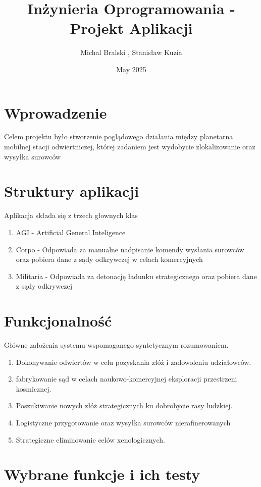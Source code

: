 \documentclass{article}
\title{Inżynieria Oprogramowania - Projekt Aplikacji}
\author{Michal Bralski , Stanisław Kuzia }
\date{May 2025}
\begin{document}
\maketitle

\section{Wprowadzenie}
Celem projektu było stworzenie poglądowego działania między planetarna mobilnej stacji odwiertniczej, której zadaniem jest wydobycie zlokalizowanie oraz wysyłka surowców 

\section{Struktury aplikacji}
Aplikacja składa się z trzech głownych klas
\begin{enumerate}
    \item AGI - Artificial General Inteligence
    \item Corpo - Odpowiada za manualne nadpisanie komendy wysłania surowców oraz pobiera dane z sądy odkrywczej w celach komercyjnych
    \item Militaria - Odpowiada za detonację ładunku strategicznego oraz pobiera dane z sądy odkrywczej
\end{enumerate}

\section{Funkcjonalność}
Główne założenia systemu wspomaganego syntetycznym rozumowaniem.
    \begin{enumerate}
        \item Dokonywanie odwiertów w celu pozyskania złóż i zadowoleniu udziałowców.
        \item fabrykowanie sąd w celach naukowo-komercyjnej eksploracji przestrzeni kosmicznej.
        \item Poszukiwanie nowych złóż strategicznych ku dobrobycie rasy ludzkiej.
        \item Logistyczne przygotowanie oraz wysyłka surowców nierafinerowanych
        \item Strategiczne eliminowanie celów xenologicznych.
    \end{enumerate}


\section{Wybrane funkcje i ich testy}
\end{document}
